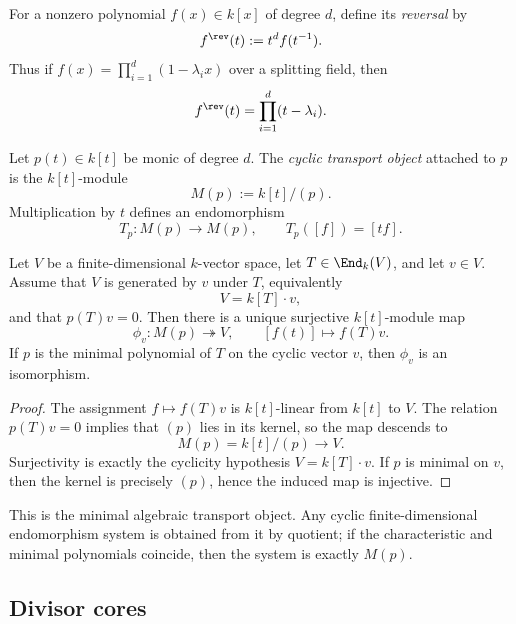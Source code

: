 \begin{definition}
For a nonzero polynomial \(f(x)\in k[x]\) of degree \(d\), define its \emph{reversal}
by
\[
f^{\rev}(t):=t^d f(t^{-1}).
\]
Thus if \(f(x)=\prod_{i=1}^d (1-\lambda_i x)\) over a splitting field,
then
\[
f^{\rev}(t)=\prod_{i=1}^d (t-\lambda_i).
\]
\end{definition}

\begin{definition}
Let \(p(t)\in k[t]\) be monic of degree \(d\).
The \emph{cyclic transport object} attached to \(p\) is the \(k[t]\)-module
\[
M(p):=k[t]/(p).
\]
Multiplication by \(t\) defines an endomorphism
\[
T_p \colon M(p)\to M(p),\qquad T_p([f])=[tf].
\]
\end{definition}

\begin{proposition}
\ClaimStatusProvedHere
Let \(V\) be a finite-dimensional \(k\)-vector space, let \(T\in \End_k(V)\), and let \(v\in V\).
Assume that \(V\) is generated by \(v\) under \(T\), equivalently
\[
V = k[T]\cdot v,
\]
and that \(p(T)v=0\).
Then there is a unique surjective \(k[t]\)-module map
\[
\phi_v \colon M(p)\twoheadrightarrow V,\qquad [f(t)]\mapsto f(T)v.
\]
If \(p\) is the minimal polynomial of \(T\) on the cyclic vector \(v\), then \(\phi_v\) is an isomorphism.
\end{proposition}

\begin{proof}
The assignment \(f\mapsto f(T)v\) is \(k[t]\)-linear from \(k[t]\) to \(V\).
The relation \(p(T)v=0\) implies that \((p)\) lies in its kernel, so the map descends to
\[
M(p)=k[t]/(p)\to V.
\]
Surjectivity is exactly the cyclicity hypothesis \(V=k[T]\cdot v\).
If \(p\) is minimal on \(v\), then the kernel is precisely \((p)\), hence the induced map is injective.
\end{proof}

\begin{remark}
This is the minimal algebraic transport object.
Any cyclic finite-dimensional endomorphism system is obtained from it by quotient;
if the characteristic and minimal polynomials coincide, then the system is exactly \(M(p)\).
\end{remark}

\subsection{Divisor cores}

